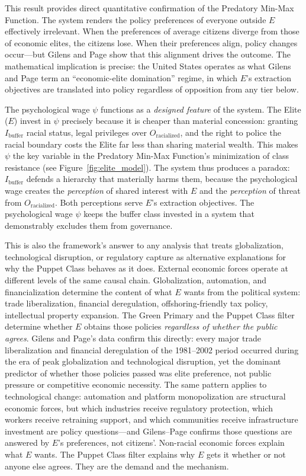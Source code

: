 This result provides direct quantitative confirmation of the Predatory Min-Max Function. The system renders the policy preferences of everyone outside $E$ effectively irrelevant. When the preferences of average citizens diverge from those of economic elites, the citizens lose. When their preferences align, policy changes occur---but Gilens and Page show that this alignment drives the outcome. The mathematical implication is precise: the United States operates as what Gilens and Page term an ``economic-elite domination'' regime, in which $E$'s extraction objectives are translated into policy regardless of opposition from any tier below.

The psychological wage $\psi$ functions as a \textit{designed feature} of the system. The Elite ($E$) invest in $\psi$ precisely because it is cheaper than material concession: granting $I_{\text{buffer}}$ racial status, legal privileges over $O_{\text{racialized}}$, and the right to police the racial boundary costs the Elite far less than sharing material wealth. This makes $\psi$ the key variable in the Predatory Min-Max Function's minimization of class resistance (see Figure~\ref{fig:elite_model}). The system thus produces a paradox: $I_{\text{buffer}}$ defends a hierarchy that materially harms them, because the psychological wage creates the \textit{perception} of shared interest with $E$ and the \textit{perception} of threat from $O_{\text{racialized}}$. Both perceptions serve $E$'s extraction objectives. The psychological wage $\psi$ keeps the buffer class invested in a system that demonstrably excludes them from governance.

This is also the framework's answer to any analysis that treats globalization, technological disruption, or regulatory capture as alternative explanations for why the Puppet Class behaves as it does. External economic forces operate at different levels of the same causal chain. Globalization, automation, and financialization determine the content of what $E$ wants from the political system: trade liberalization, financial deregulation, offshoring-friendly tax policy, intellectual property expansion. The Green Primary and the Puppet Class filter determine whether $E$ obtains those policies \textit{regardless of whether the public agrees}. Gilens and Page's data confirm this directly: every major trade liberalization and financial deregulation of the 1981--2002 period occurred during the era of peak globalization and technological disruption, yet the dominant predictor of whether those policies passed was elite preference, not public pressure or competitive economic necessity. The same pattern applies to technological change: automation and platform monopolization are structural economic forces, but which industries receive regulatory protection, which workers receive retraining support, and which communities receive infrastructure investment are policy questions---and Gilens--Page confirms those questions are answered by $E$'s preferences, not citizens'. Non-racial economic forces explain what $E$ wants. The Puppet Class filter explains why $E$ gets it whether or not anyone else agrees. They are the demand and the mechanism.

